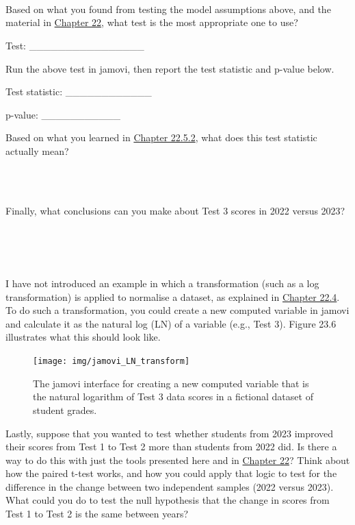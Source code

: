 \documentclass[
]{scrbook}
\begin{document}
\begin{verbatim}




\end{verbatim}

Based on what you found from testing the model assumptions above, and the material in \protect\hyperlink{Chapter_22}{Chapter 22}, what test is the most appropriate one to use?

Test: \_\_\_\_\_\_\_\_\_\_\_\_\_\_\_\_

Run the above test in jamovi, then report the test statistic and p-value below.

Test statistic: \_\_\_\_\_\_\_\_\_\_\_\_

p-value: \_\_\_\_\_\_\_\_\_\_\_

Based on what you learned in \protect\hyperlink{mann-whitney-u-test}{Chapter 22.5.2}, what does this test statistic actually mean?

\begin{verbatim}



\end{verbatim}

Finally, what conclusions can you make about Test 3 scores in 2022 versus 2023?

\begin{verbatim}




\end{verbatim}

I have not introduced an example in which a transformation (such as a log transformation) is applied to normalise a dataset, as explained in \protect\hyperlink{assumptions-of-t-tests}{Chapter 22.4}.
To do such a transformation, you could create a new computed variable in jamovi and calculate it as the natural log (LN) of a variable (e.g., Test 3).
Figure 23.6 illustrates what this should look like.

\begin{figure}
\texttt{[image: img/jamovi\_LN\_transform]} \caption{The jamovi interface for creating a new computed variable that is the natural logarithm of Test 3 data scores in a fictional dataset of student grades.}\label{fig:unnamed-chunk-107}
\end{figure}

Lastly, suppose that you wanted to test whether students from 2023 improved their scores from Test 1 to Test 2 more than students from 2022 did.
Is there a way to do this with just the tools presented here and in \protect\hyperlink{Chapter_22}{Chapter 22}?
Think about how the paired t-test works, and how you could apply that logic to test for the difference in the change between two independent samples (2022 versus 2023).
What could you do to test the null hypothesis that the change in scores from Test 1 to Test 2 is the same between years?
\end{document}
